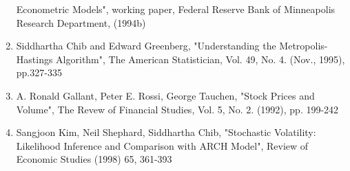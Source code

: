 \documentclass{article}
\begin{document}
\begin{enumerate}
Econometric Models", working paper, Federal Reserve Bank of
Minneapolis Research Department, (1994b)
\item
Siddhartha Chib and Edward Greenberg, "Understanding the Metropolis-Hastings Algorithm", The American Statistician, Vol. 49, No. 4. (Nov., 1995), pp.327-335
\item
A. Ronald Gallant, Peter E. Rossi, George Tauchen, "Stock Prices and Volume", The Revew of Financial Studies, Vol. 5, No. 2. (1992), pp. 199-242
\item
Sangjoon Kim, Neil Shephard, Siddhartha Chib, "Stochastic Volatility: Likelihood Inference and Comparison with ARCH Model", Review of Economic Studies (1998) 65, 361-393
\end{enumerate}
\end{document}
